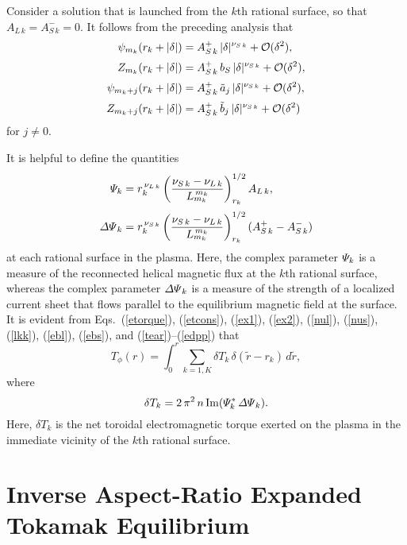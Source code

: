 \documentclass[12pt,prb,aps]{revtex4-1}
\begin{document}
Consider a solution that is launched from the $k$th rational surface, so that $A_{L\,k} = A_{S\,k}^-=0$. It follows from the preceding analysis that
\begin{align}
\psi_{m_k}(r_k+|\delta|) &= A_{S\,k}^+\,|\delta|^{\nu_{S\,k}}+ {\cal O}(\delta^2),\\[0.5ex]
Z_{m_k}(r_k+|\delta|) &= A_{S\,k}^+\,b_S\,|\delta|^{\nu_{S\,k}}+ {\cal O}(\delta^2),\\[0.5ex]
\psi_{m_k+j}(r_k+|\delta|)& = A_{S\,k}^+\,\tilde{a}_j\,|\delta|^{\nu_{S\,k}}+ {\cal O}(\delta^2),\\[0.5ex]
Z_{m_k+j}(r_k+|\delta|) &= A_{S\,k}^+\,\tilde{b}_j\,|\delta|^{\nu_{S\,k}}+ {\cal O}(\delta^2)
\end{align}
for $j\neq 0$. 

It is helpful to define the quantities\,\cite{am1}
\begin{align}\label{Psidef}
{\mit\Psi}_k&= r_k^{\,\nu_{L\,k}}\left(\frac{\nu_{S\,k}-\nu_{L\,k}}{L_{m_k}^{\,{m_k}}}\right)^{1/2}_{r_k} A_{L\,k},\\[0.5ex]
{\mit\Delta\Psi}_k &= r_k^{\,\nu_{S\,k}}\left(\frac{\nu_{S\,k}-\nu_{L\,k}}{L_{m_k}^{\,m_k}}\right)^{1/2}_{r_k} (A_{S\,k}^+ - A_{S\,k}^-)\label{edpp}
\end{align}
at each rational surface in the plasma. Here, the complex parameter ${\mit\Psi}_k$ is a measure of the reconnected helical magnetic flux at the $k$th rational surface, whereas
the complex parameter ${\mit\Delta\Psi}_k$ is a measure of the strength of a localized current sheet that flows parallel to the equilibrium magnetic field at the surface. 
It is evident from Eqs.~(\ref{etorque}), (\ref{etcons}), (\ref{ex1}), (\ref{ex2}), (\ref{nul}), (\ref{nus}), (\ref{lkk}), (\ref{ebl}), (\ref{ebs}), and (\ref{tear})--(\ref{edpp}) that\, \cite{am1,am3}
\begin{equation}\label{e204z}
T_\phi(r) =\int_0^r \sum_{k=1,K}\delta T_k\,\delta(\tilde{r}-r_k)\,d\tilde{r},
\end{equation}
where
\begin{equation}\label{e194t}
\delta T_k = 2\,\pi^2\,n\,{\rm Im}({\mit\Psi}_k^\ast\,{\mit\Delta\Psi}_k).
\end{equation}
Here, $\delta T_k$ is the net toroidal electromagnetic torque exerted on the plasma in the immediate vicinity of the $k$th rational
surface. 

\section{Inverse Aspect-Ratio Expanded Tokamak Equilibrium}
\end{document}
